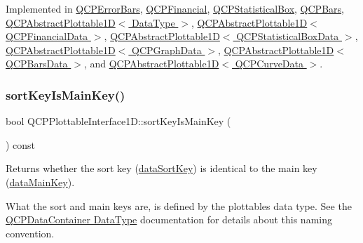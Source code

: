 Implemented in \hyperlink{classQCPErrorBars_ad7c727736599dfb173f0952082e1a5b6}{Q\+C\+P\+Error\+Bars}, \hyperlink{classQCPFinancial_a3c5beb1ab028a1dba845fc9dcffc7cf4}{Q\+C\+P\+Financial}, \hyperlink{classQCPStatisticalBox_a42febad6ad5e924a151434cc434b4ffc}{Q\+C\+P\+Statistical\+Box}, \hyperlink{classQCPBars_ab03bb6125c3e983b89d694f75ce6b3d5}{Q\+C\+P\+Bars}, \hyperlink{classQCPAbstractPlottable1D_a22377bf6e57ab7eedbc9e489250c6ded}{Q\+C\+P\+Abstract\+Plottable1\+D$<$ Data\+Type $>$}, \hyperlink{classQCPAbstractPlottable1D_a22377bf6e57ab7eedbc9e489250c6ded}{Q\+C\+P\+Abstract\+Plottable1\+D$<$ Q\+C\+P\+Financial\+Data $>$}, \hyperlink{classQCPAbstractPlottable1D_a22377bf6e57ab7eedbc9e489250c6ded}{Q\+C\+P\+Abstract\+Plottable1\+D$<$ Q\+C\+P\+Statistical\+Box\+Data $>$}, \hyperlink{classQCPAbstractPlottable1D_a22377bf6e57ab7eedbc9e489250c6ded}{Q\+C\+P\+Abstract\+Plottable1\+D$<$ Q\+C\+P\+Graph\+Data $>$}, \hyperlink{classQCPAbstractPlottable1D_a22377bf6e57ab7eedbc9e489250c6ded}{Q\+C\+P\+Abstract\+Plottable1\+D$<$ Q\+C\+P\+Bars\+Data $>$}, and \hyperlink{classQCPAbstractPlottable1D_a22377bf6e57ab7eedbc9e489250c6ded}{Q\+C\+P\+Abstract\+Plottable1\+D$<$ Q\+C\+P\+Curve\+Data $>$}.

\mbox{\label{classQCPPlottableInterface1D_a229e65e7ab968dd6cd0e259fa504b79d}} 
\subsubsection{\texorpdfstring{sort\+Key\+Is\+Main\+Key()}{sortKeyIsMainKey()}}
{\footnotesize\ttfamily bool Q\+C\+P\+Plottable\+Interface1\+D\+::sort\+Key\+Is\+Main\+Key (\begin{DoxyParamCaption}{ }\end{DoxyParamCaption}) const\hspace{0.3cm}{\ttfamily [pure virtual]}}

Returns whether the sort key (\hyperlink{classQCPPlottableInterface1D_afdc92f9f01e7e35f2e96b2ea9dc14ae7}{data\+Sort\+Key}) is identical to the main key (\hyperlink{classQCPPlottableInterface1D_a2bd60daaac046945fead558cbd83cf73}{data\+Main\+Key}).

What the sort and main keys are, is defined by the plottable\textquotesingle{}s data type. See the \hyperlink{classQCPDataContainer_qcpdatacontainer-datatype}{Q\+C\+P\+Data\+Container Data\+Type} documentation for details about this naming convention. 

